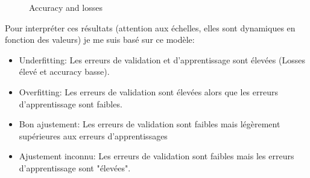 \documentclass[a4paper,12pt]{report}
\begin{document}
\begin{figure}[!h]
        \qquad
        \qquad
        \caption{Accuracy and losses}%
      \end{figure}%
      \FloatBarrier
      \bigbreak
      Pour interpréter ces résultats (attention aux échelles, elles sont dynamiques en fonction des valeurs) je me suis basé sur ce modèle:
      \begin{itemize}
        \item Underfitting: Les erreurs de validation et d'apprentissage sont élevées (Losses élevé et accuracy basse).
        \item Overfitting: Les erreurs de validation sont élevées alors que les erreurs d'apprentissage sont faibles.
        \item Bon ajustement: Les erreurs de validation sont faibles mais légèrement supérieures aux erreurs d'apprentissages
        \item Ajustement inconnu: Les erreurs de validation sont faibles mais les erreurs d'apprentissage sont "élevées".
      \end{itemize}
\end{document}

